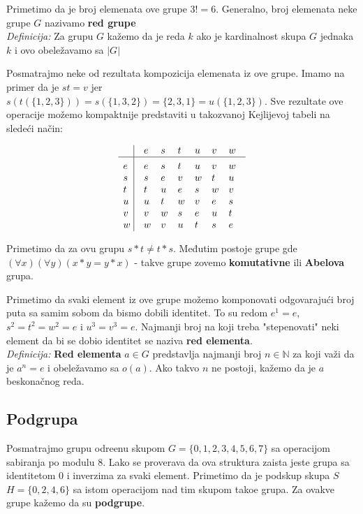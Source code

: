 \documentclass{article}
\begin{document}
Primetimo da je broj elemenata ove grupe $3! = 6$. Generalno, broj elemenata neke grupe $G$ nazivamo \textbf{red grupe} \\

\textit{Definicija:} Za grupu $G$ kažemo da je reda $k$ ako je kardinalnost skupa $G$ jednaka $k$ i ovo obeležavamo sa $|G|$

Posmatrajmo neke od rezultata kompozicija elemenata iz ove grupe. Imamo na primer da je $st=v$ jer $s(t(\{1, 2, 3\})) = s(\{1, 3, 2\}) = \{2, 3, 1\} = u(\{1, 2, 3\})$. Sve rezultate ove operacije možemo kompaktnije predstaviti u takozvanoj Kejlijevoj tabeli na sledeći način:

$$\vbox{\tabskip0.5em\offinterlineskip
    \halign{\strut$#$\hfil\ \tabskip1em\vrule&&$#$\hfil\cr
    ~   & e   & s   & t & u   & v   & w   \cr
    \noalign{\hrule}\vrule height 12pt width 0pt
    e   & e   & s   & t   & u   & v   & w   \cr
    s   & s   & e   & v   & w   & t   & u   \cr
    t   & t   & u   & e   & s   & w   & v   \cr
    u   & u   & t   & w   & v   & e   & s   \cr
    v   & v   & w   & s   & e   & u   & t   \cr
    w   & w   & v   & u   & t   & s   & e   \cr
}}$$

Primetimo da za ovu grupu $s*t \neq t*s$. Međutim postoje grupe gde $(\forall x)(\forall y)(x*y = y*x)$ - takve grupe zovemo \textbf{komutativne} ili \textbf{Abelova} grupa.  

Primetimo da svaki element iz ove grupe možemo komponovati odgovarajući broj puta sa samim sobom da bismo dobili identitet. To su redom $e^1 = e$, $s^2 = t^2 = w^2 = e$ i $u^3 = v^3 = e$. Najmanji broj na koji treba "stepenovati" neki element da bi se dobio identitet se naziva \textbf{red elementa}. \\

\textit{Definicija:} \textbf{Red elementa} $a \in G$ predstavlja najmanji broj $n \in \mathbb{N}$ za koji važi da je $a^n = e$ i obeležavamo sa $o(a)$. Ako takvo $n$ ne postoji, kažemo da je $a$ beskonačnog reda. 

\subsection{Podgrupa}

Posmatrajmo grupu odre\dj enu skupom $ G = \{0, 1, 2, 3, 4, 5, 6, 7\}$ sa operacijom sabiranja po modulu $8$. Lako se proverava da ova struktura zaista jeste grupa sa identitetom $0$ i inverzima za svaki element. Primetimo da je podskup skupa $S$ $H = \{0, 2, 4, 6\}$ sa istom operacijom nad tim skupom tako\dj e grupa. Za ovakve grupe kažemo da su \textbf{podgrupe}. \\
\end{document}
